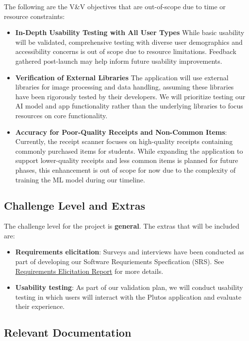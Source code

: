 \documentclass[12pt, titlepage]{article}
\begin{document}
The following are the V\&V objectives that are out-of-scope due to time or
resource constraints:
\begin{itemize}
	\item \textbf{In-Depth Usability Testing with All User Types} While basic
usability will be validated, comprehensive testing with diverse user
demographics and accessibility concerns is out of scope due to resource
limitations. Feedback gathered post-launch may help inform future usability
improvements. 
	\item \textbf{Verification of External Libraries} The application will use
external libraries for image processing and data handling, assuming these
libraries have been rigorously tested by their developers. We will prioritize
testing our AI model and app functionality rather than the underlying libraries
to focus resources on core functionality. 
	\item \textbf{Accuracy for Poor-Quality Receipts and Non-Common Items}:
Currently, the receipt scanner focuses on high-quality receipts containing
commonly purchased items for students. While expanding the application to
support lower-quality receipts and less common items is planned for future
phases, this enhancement is out of scope for now due to the complexity of
training the ML model during our timeline.

\end{itemize}



\subsection{Challenge Level and Extras}

The challenge level for the project is \textbf{general}. The extras that will be included are: 
\begin{itemize}
	\item \textbf{Requirements elicitation}: Surveys and interviews have been
	conducted as part of developing our Software Requriements Specfication
	(SRS). See
	\href{https://github.com/PlutosCapstone/Plutos/tree/main/docs/Extras/RequirementsElicitationReport.pdf}{Requirements
	Elicitation Report} for more details.
	\item \textbf{Usability testing}: As part of our validation plan, we will conduct
	usability testing in which users will interact with the Plutos application and
	evaluate their experience.
\end{itemize}

\subsection{Relevant Documentation}
\end{document}
